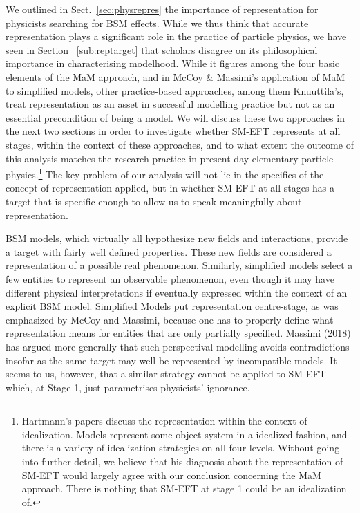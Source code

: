 We outlined in Sect.~\ref{sec:physrepres} the importance of representation for physicists searching for BSM effects. 
While we thus think that accurate representation plays a significant role in the practice of particle physics, we have seen in Section ~\ref{sub:reptarget} that scholars disagree on its philosophical importance in characterising modelhood. While it figures among the four basic elements of the MaM approach, and in McCoy \& Massimi's application of MaM to simplified models, other practice-based approaches, among them Knuuttila's, treat representation as an asset in successful modelling practice but not as an essential precondition of being a model. We will discuss these two approaches in the next two sections in order to investigate whether SM-EFT represents at all stages, within the context of these approaches, and to what extent the outcome of this analysis matches the research practice in present-day elementary particle physics.\footnote{Hartmann's papers discuss the representation within the context of idealization. Models represent some object system in a idealized fashion, and there is a variety of idealization strategies on all four levels. Without going into further detail, we believe that his diagnosis about the representation of SM-EFT would largely agree with our conclusion concerning the MaM approach. There is nothing that SM-EFT at stage 1 could be an idealization of.}
The key problem of our analysis will not lie in the specifics of the concept of representation applied, but in whether SM-EFT at all stages has a target that is specific enough to allow us to speak meaningfully about representation.

BSM models, which virtually all hypothesize new fields and interactions, provide a target with fairly well defined properties. 
These new fields are considered a representation of a possible real phenomenon.
Similarly, simplified models select a few entities to represent an observable phenomenon, even though it may have different physical interpretations if eventually expressed within the context of an explicit BSM model.
Simplified Models put representation centre-stage, as was emphasized by McCoy and Massimi, because one has to properly define what representation means for entities that are only partially specified. Massimi (2018) has argued more generally that such perspectival modelling avoids contradictions insofar as the same target may well be represented by incompatible models. It seems to us, however, that a similar strategy cannot be applied to SM-EFT which, at Stage 1, just parametrises physicists' ignorance.

